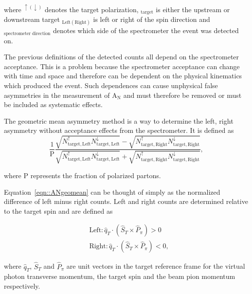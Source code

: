 \noindent
where $^{\uparrow(\downarrow)}$ denotes the target polarization,
$_{\mathrm{target}}$ is either the upstream or downstream target
$_{\mathrm{Left(Right)}}$ is left or right of the spin direction and
${_\mathrm{spectrometer \; direction}}$ denotes which side of the spectrometer
the event was detected on.

The previous definitions of the detected counts all depend on the spectrometer
acceptance.  This is a problem because the spectrometer acceptance can change
with time and space and therefore can be dependent on the physical kinematics
which produced the event.  Such dependences can cause unphysical false
asymmetries in the measurement of A$_{\mathrm{N}}$ and must therefore be removed
or must be included as systematic effects.

The geometric mean asymmetry method is a way to determine the left, right
asymmetry without acceptance effects from the spectrometer.  It is defined as
\begin{equation}
  \label{eqn::ANgeomean}
\frac{1}{\mathrm{P}}\frac{\sqrt{N_{\mathrm{target,
        Left}}^{\uparrow}N_{\mathrm{target, Left}}^{\downarrow}} -
  \sqrt{N_{\mathrm{target, Right}}^{\uparrow}N_{\mathrm{target,
        Right}}^{\downarrow}} }{\sqrt{N_{\mathrm{target,
        Left}}^{\uparrow}N_{\mathrm{target, Left}}^{\downarrow}} +
  \sqrt{N_{\mathrm{target, Right}}^{\uparrow}N_{\mathrm{target,
        Right}}^{\downarrow}} },
\end{equation}

\noindent
where P represents the fraction of polarized partons.

Equation~\ref{eqn::ANgeomean} can be thought of simply as the normalized
difference of left minus right counts.  Left and right counts are determined
relative to the target spin and are defined as

\begin{equation}
  \label{equ::Defleftright}
  \begin{aligned}
    &\text{Left}: \hat{q}_T \cdot (\hat{S}_T \times \hat{P}_{\pi}) > 0 \\
    &\text{Right}: \hat{q}_T \cdot (\hat{S}_T \times \hat{P}_{\pi}) < 0, 
  \end{aligned}
\end{equation}

\noindent
where $\hat{q}_T$, $\hat{S}_T$ and $\hat{P}_{\pi}$ are unit vectors in the
target reference frame for the virtual photon transverse momentum, the target
spin and the beam pion momentum respectively.

